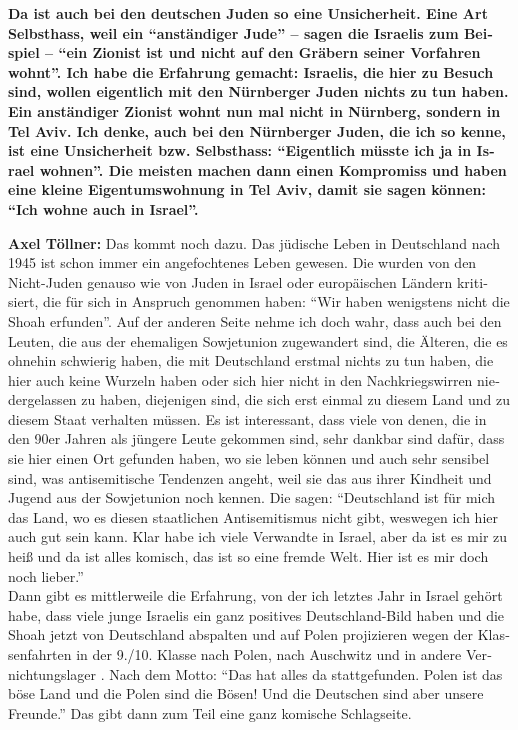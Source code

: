 \begin{otherlanguage}{ngerman}
\textbf{Da ist auch bei den deutschen Juden so eine Unsicherheit. Eine Art Selbsthass, weil ein "`anständiger Jude"' – sagen die Israelis zum Beispiel – "`ein Zionist ist und nicht auf den Gräbern seiner Vorfahren wohnt"'. Ich habe die Erfahrung gemacht: Israelis, die hier zu Besuch sind, wollen eigentlich mit den Nürnberger Juden nichts zu tun haben. Ein anständiger Zionist wohnt nun mal nicht in Nürnberg, sondern in Tel Aviv. Ich denke, auch bei den Nürnberger Juden, die ich so kenne, ist eine Unsicherheit bzw. Selbsthass: "`Eigentlich müsste ich ja in Israel wohnen"'. Die meisten machen dann einen Kompromiss und haben eine kleine Eigentumswohnung in Tel Aviv, damit sie sagen können: "`Ich wohne auch in Israel"'.}  

\textbf{Axel Töllner:} Das kommt noch dazu. Das jüdische Leben in Deutschland nach 1945 ist schon immer ein angefochtenes Leben gewesen. Die wurden von den Nicht-Juden genauso wie von Juden in Israel oder europäischen Ländern kritisiert, die für sich in Anspruch genommen haben: "`Wir haben wenigstens nicht die Shoah erfunden"'. Auf der anderen Seite nehme ich doch wahr, dass auch bei den Leuten, die aus der ehemaligen Sowjetunion zugewandert sind, die Älteren, die es ohnehin schwierig haben, die mit Deutschland erstmal nichts zu tun haben, die hier auch keine Wurzeln haben oder sich hier nicht in den Nachkriegswirren niedergelassen zu haben, diejenigen sind, die sich erst einmal zu diesem Land und zu diesem Staat verhalten müssen. Es ist interessant, dass viele von denen, die in den 90er Jahren als jüngere Leute gekommen sind, sehr dankbar sind dafür, dass sie hier einen Ort gefunden haben, wo sie leben können und auch sehr sensibel sind, was antisemitische Tendenzen angeht, weil sie das aus ihrer Kindheit und Jugend aus der Sowjetunion noch kennen. Die sagen: "`Deutschland ist für mich das Land, wo es diesen staatlichen Antisemitismus nicht gibt, weswegen ich hier auch gut sein kann. Klar habe ich viele Verwandte in Israel, aber da ist es mir zu heiß und da ist alles komisch, das ist so eine fremde Welt. Hier ist es mir doch noch lieber."' \\ 
Dann gibt es mittlerweile die Erfahrung, von der ich letztes Jahr in Israel gehört habe, dass viele junge Israelis ein ganz positives Deutschland-Bild haben und die Shoah jetzt von Deutschland abspalten und auf Polen projizieren wegen der Klassenfahrten in der 9./10. Klasse nach Polen, nach Auschwitz und in andere Vernichtungslager . Nach dem Motto: "`Das hat alles da stattgefunden. Polen ist das böse Land und die Polen sind die Bösen! Und die Deutschen sind aber unsere Freunde."' Das gibt dann zum Teil eine ganz komische Schlagseite. 


\end{otherlanguage}
